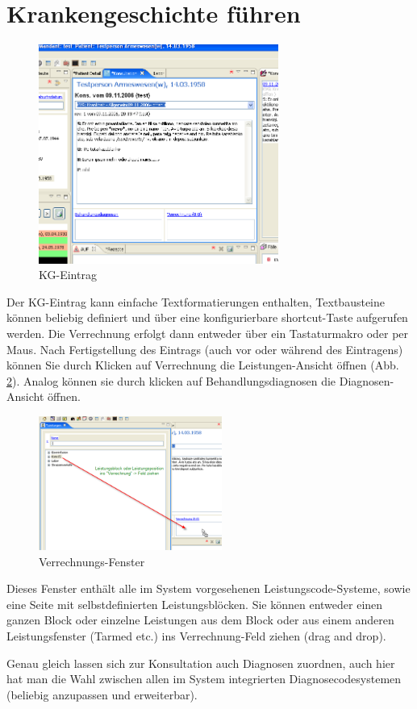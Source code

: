 \section{Krankengeschichte führen}
\begin{figure}
    \begin{center}
	   \includegraphics[width=0.7\textwidth]{images/einf6}
    	\caption{KG-Eintrag}
	   \label{fig:KG}
    \end{center}
\end{figure}
Der KG-Eintrag kann einfache Textformatierungen enthalten, Textbausteine können
beliebig definiert und über eine konfigurierbare shortcut-Taste aufgerufen werden. Die Verrechnung erfolgt dann entweder über ein Tastaturmakro oder per Maus.
Nach Fertigstellung des Eintrags (auch vor oder während des Eintragens) können
Sie durch Klicken auf \glqq Verrechnung\grqq{} die Leistungen-Ansicht öffnen
(Abb. \ref{fig:Verrechnung}). Analog können sie durch klicken auf
\glqq Behandlungsdiagnosen\grqq{} die Diagnosen-Ansicht öffnen.

\begin{figure}[ht]
	\includegraphics[width=6cm]{images/einf7}
	\caption{Verrechnungs-Fenster}
	\label{fig:Verrechnung}
\end{figure}
Dieses Fenster enthält alle im System vorgesehenen Leistungscode-Systeme, sowie eine Seite mit selbstdefinierten Leistungsblöcken.
Sie können entweder einen ganzen Block oder einzelne Leistungen aus dem Block oder aus einem anderen Leistungsfenster (Tarmed etc.) ins \glqq Verrechnung\grqq{}-Feld ziehen (drag and drop).

Genau gleich lassen sich zur Konsultation auch Diagnosen zuordnen, auch hier hat man die Wahl zwischen allen im System integrierten Diagnosecodesystemen (beliebig anzupassen und erweiterbar).

\clearpage
